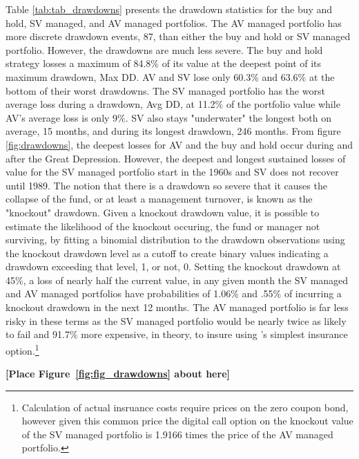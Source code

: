 Table \ref{tab:tab_drawdowns} presents the drawdown statistics for the buy and hold, SV managed, and AV managed portfolios. The AV managed portfolio has more discrete drawdown events, 87, than either the buy and hold or SV managed portfolio. However, the drawdowns are much less severe. The buy and hold strategy losses a maximum of 84.8\% of its value at the deepest point of its maximum drawdown, Max DD. AV and SV lose only 60.3\% and 63.6\% at the bottom of their worst drawdowns. The SV managed portfolio has the worst average loss during a drawdown, Avg DD, at 11.2\% of the portfolio value while AV's average loss is only 9\%. SV also stays "underwater" the longest both on average, 15 months, and during its longest drawdown, 246 months. From figure \ref{fig:drawdowns}, the deepest losses for AV and the buy and hold occur during and after the Great Depression. However, the deepest and longest sustained losses of value for the SV managed portfolio start in the 1960s and SV does not recover until 1989. The notion that there is a drawdown so severe that it causes the collapse of the fund, or at least a management turnover, is known as the "knockout" drawdown. Given a knockout drawdown value, it is possible to estimate the likelihood of the knockout occuring, the fund or manager not surviving, by fitting a binomial distribution to the drawdown observations using the knockout drawdown level as a cutoff to create binary values indicating a drawdown exceeding that level, 1, or not, 0. \citep{pav_notes_nodate} Setting the knockout drawdown at 45\%, a loss of nearly half the current value, in any given month the SV managed and AV managed portfolios have probabilities of 1.06\% and .55\% of incurring a knockout drawdown in the next 12 months. The AV managed portfolio is far less risky in these terms as the SV managed portfolio would be nearly twice as likely to fail and 91.7\% more expensive, in theory, to insure using \citet{carr_maximum_2011}'s simplest insurance option.\footnote{Calculation of actual insruance costs require prices on the zero coupon bond, however given this common price the digital call option on the knockout value of the SV managed portfolio is 1.9166 times the price of the AV managed portfolio.}

\bigskip
\centerline{\bf [Place Figure~\ref{fig:fig_drawdowns} about here]}
\bigskip